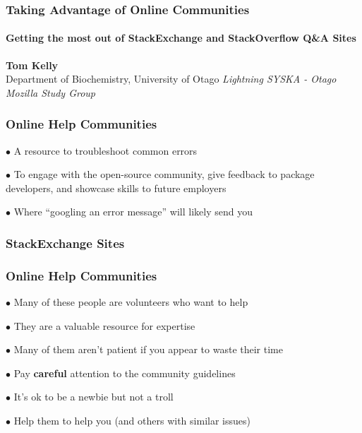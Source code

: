 \documentclass{beamer}
\begin{document}
\begin{frame}
    \frametitle{Taking Advantage of Online Communities}
    \framesubtitle{Getting the most out of StackExchange and StackOverflow Q\&A Sites}
    
    
    \begin{center}
      \textbf{Tom Kelly} \\
      Department of Biochemistry, University of Otago
      \newline
      \newline
      \textit{Lightning SYSKA - Otago Mozilla Study Group}
    \end{center}        

  \end{frame}
  \begin{frame}
    \frametitle{Online Help Communities}
        
      $\bullet$ A resource to troubleshoot common errors
      
      $\bullet$ To engage with the open-source community, give feedback to package developers, and showcase skills to future employers
      
      $\bullet$ Where ``googling an error message'' will likely send you
      
  \end{frame}
  \begin{frame}
    \frametitle{StackExchange Sites}
    
    \begin{center}
     
      
    \end{center}  
  \end{frame}
    \begin{frame}
    \frametitle{Online Help Communities}
        
      $\bullet$ Many of these people are volunteers who want to help
      
      $\bullet$ They are a valuable resource for expertise
      
      $\bullet$ Many of them aren't patient if you appear to waste their time
      
      $\bullet$ Pay \textbf{careful} attention to the community guidelines

      $\bullet$ It's ok to be a newbie but not a troll
      
      $\bullet$ Help them to help you (and others with similar issues)
            
  \end{frame}
\end{document}
